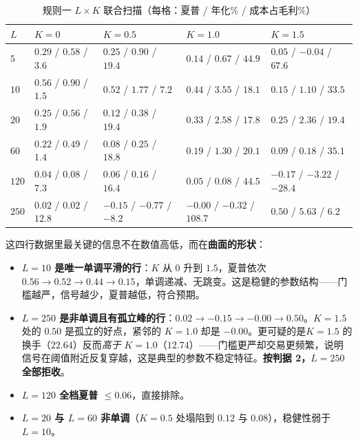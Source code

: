 \begin{table}[htbp]
\centering\footnotesize
\caption{规则一 $L\times K$ 联合扫描（每格：夏普 / 年化\% / 成本占毛利\%）}\label{tab:r1LK}
\begin{tabular}{@{}>{\raggedright\arraybackslash}p{0.9cm}>{\raggedright\arraybackslash}p{2.5cm}>{\raggedright\arraybackslash}p{2.5cm}>{\raggedright\arraybackslash}p{2.5cm}>{\raggedright\arraybackslash}p{2.5cm}@{}}
\toprule
\textbf{$L$} & \textbf{$K=0$} & \textbf{$K=0.5$} & \textbf{$K=1.0$} & \textbf{$K=1.5$} \\
\midrule
$5$   & $0.29$ / $0.58$ / $3.6$  & $0.25$ / $0.90$ / $19.4$ & $0.14$ / $0.67$ / $44.9$ & $0.05$ / $-0.04$ / $67.6$ \\
$10$  & $\mathbf{0.56}$ / $0.90$ / $1.5$ & $0.52$ / $1.77$ / $7.2$ & $\mathbf{0.44}$ / $3.55$ / $18.1$ & $0.15$ / $1.10$ / $33.5$ \\
$20$  & $0.25$ / $0.56$ / $1.9$ & $0.12$ / $0.38$ / $19.4$ & $0.33$ / $2.58$ / $17.8$ & $0.25$ / $2.36$ / $19.4$ \\
$60$  & $0.22$ / $0.49$ / $1.4$ & $0.08$ / $0.25$ / $18.8$ & $0.19$ / $1.30$ / $20.1$ & $0.09$ / $0.18$ / $35.1$ \\
$120$ & $0.04$ / $0.08$ / $7.3$  & $0.06$ / $0.16$ / $16.4$ & $0.05$ / $0.08$ / $44.5$ & $-0.17$ / $-3.22$ / $-28.4$ \\
$250$ & $0.02$ / $0.02$ / $12.8$ & $-0.15$ / $-0.77$ / $-8.2$ & $-0.00$ / $-0.32$ / $108.7$ & $0.50$ / $5.63$ / $6.2$ \\
\bottomrule
\end{tabular}
\end{table}

这四行数据里最关键的信息不在数值高低，而在\textbf{曲面的形状}：

\begin{itemize}[leftmargin=2.2em]
  \item \textbf{$L=10$ 是唯一单调平滑的行}：$K$ 从 $0$ 升到 $1.5$，夏普依次 $0.56\to0.52\to0.44\to0.15$，单调递减、无跳变。这是稳健的参数结构——门槛越严，信号越少，夏普越低，符合预期。
  \item \textbf{$L=250$ 是非单调且有孤立峰的行}：$0.02\to-0.15\to-0.00\to\mathbf{0.50}$。$K=1.5$ 处的 $0.50$ 是孤立的好点，紧邻的 $K=1.0$ 却是 $-0.00$。更可疑的是$K=1.5$ 的换手（$22.64$）反而\emph{高于} $K=1.0$（$12.74$）——门槛更严却交易更频繁，说明信号在阈值附近反复穿越，这是典型的参数不稳定特征。\textbf{按判据 2，$L=250$ 全部拒收}。
  \item \textbf{$L=120$ 全档夏普 $\le0.06$}，直接排除。
  \item \textbf{$L=20$ 与 $L=60$ 非单调}（$K=0.5$ 处塌陷到 $0.12$ 与 $0.08$），稳健性弱于 $L=10$。
\end{itemize}

